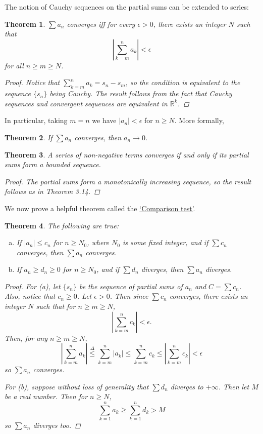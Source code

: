 \documentclass{scrbook}
\newcommand{\R}{\mathbb{R}}
\renewcommand{\to}{\rightarrow}
\renewcommand{\underline}{\ul}
\newtheorem{theorem}{Theorem}
\begin{document}
The notion of Cauchy sequences on the partial sums can be extended to series:
\begin{theorem} %
$\sum a_n$ converges iff for every $\epsilon > 0$, there exists an integer $N$ such that
\[
	\left| \sum_{k=m}^{n} a_k \right| < \epsilon
\]
for all $n \ge m \ge N$. 

\begin{proof}
Notice that $\sum_{k=m}^{n} a_k = s_n - s_m$, so the condition is equivalent to the sequence $\{s_n\}$ being Cauchy. The result follows from the fact that Cauchy sequences and convergent sequences are equivalent in $\R^k$.
\end{proof}
\end{theorem}

In particular, taking $m = n$ we have $|a_n| < \epsilon$ for $n \ge N$. More formally,

\begin{theorem} %
If $\sum a_n$ converges, then $a_n \to 0$.
\end{theorem}

\begin{theorem} %
A series of non-negative terms converges if and only if its partial sums form a bounded sequence.

\begin{proof}
The partial sums form a monotonically increasing sequence, so the result follows as in Theorem 3.14.
\end{proof}
\end{theorem}

We now prove a helpful theorem called the \underline{`Comparison test'}. 

\begin{theorem} %
The following are true:
\begin{enumerate}[(a)]
\item If $|a_n| \le c_n$ for $n \ge N_0$, where $N_0$ is some fixed integer, and if $\sum c_n$ converges, then $\sum a_n$ converges.

\item If $a_n \ge d_n \ge 0$ for $n \ge N_0$, and if $\sum d_n$ diverges, then $\sum a_n$ diverges.
\end{enumerate}

\begin{proof}
For (a), let $\{s_n\}$ be the sequence of partial sums of $a_n$ and $C = \sum c_n$. Also, notice that $c_n \ge 0$. Let $\epsilon > 0$. Then since $\sum c_n$ converges, there exists an integer $N$ such that for $n \ge m \ge N$,
\[
	\left|\sum_{k=m}^{n} c_k\right| < \epsilon.
\]
Then, for any $n \ge m \ge N$,
\[
	\left| \sum_{k=m}^{n} a_k \right| \overset{\Delta}{\le} \sum_{k=m}^{n} |a_k| \le \sum_{k=m}^{n} c_k \le \left|\sum_{k=m}^{n} c_k\right| < \epsilon
\]
so $\sum a_n$ converges.

For (b), suppose without loss of generality that $\sum d_n$ diverges to $+\infty$. Then let $M$ be a real number. Then for $n \ge N$, 
\[
	\sum_{k=1}^{n} a_k \ge \sum_{k=1}^{n} d_k > M
\]
so $\sum a_n$ diverges too.
\end{proof}
\end{theorem}
\end{document}

